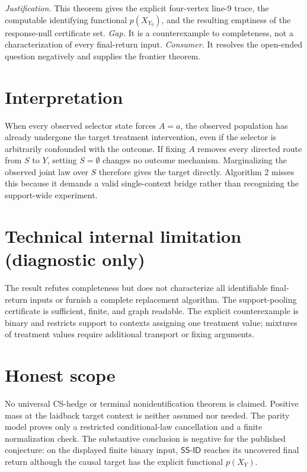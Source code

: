 \documentclass{article}
\begin{document}
\par\smallskip\noindent \textit{Justification.} This theorem gives the explicit four-vertex line-9 trace, the computable identifying functional \(p(X_{Y_0})\), and the resulting emptiness of the response-null certificate set. \textit{Gap.} It is a counterexample to completeness, not a characterization of every final-return input. \textit{Consumer.} It resolves the open-ended question negatively and supplies the frontier theorem.

\section{Interpretation}

When every observed selector state forces \(A=a\), the observed population has already undergone the target treatment intervention, even if the selector is arbitrarily confounded with the outcome. If fixing \(A\) removes every directed route from \(S\) to \(Y\), setting \(S=\emptyset\) changes no outcome mechanism. Marginalizing the observed joint law over \(S\) therefore gives the target directly. Algorithm 2 misses this because it demands a valid single-context bridge rather than recognizing the support-wide experiment.

\section*{Technical internal limitation (diagnostic only)}

The result refutes completeness but does not characterize all identifiable final-return inputs or furnish a complete replacement algorithm. The support-pooling certificate is sufficient, finite, and graph readable. The explicit counterexample is binary and restricts support to contexts assigning one treatment value; mixtures of treatment values require additional transport or fixing arguments.

\section{Honest scope}

No universal CS-hedge or terminal nonidentification theorem is claimed. Positive mass at the laidback target context is neither assumed nor needed. The parity model proves only a restricted conditional-law cancellation and a finite normalization check. The substantive conclusion is negative for the published conjecture: on the displayed finite binary input, \(\mathsf{SS\text{-}ID}\) reaches its uncovered final return although the causal target has the explicit functional \(p(X_Y)\).
\end{document}
